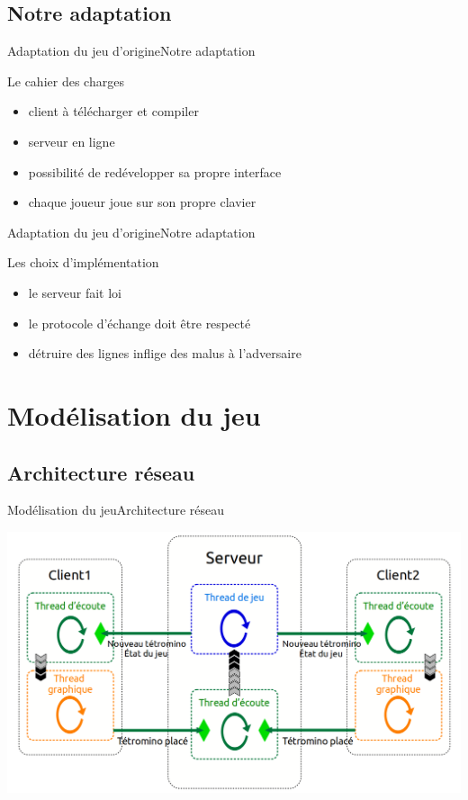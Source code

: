 \documentclass[french]{beamer}
\begin{document}
	\subsection{Notre adaptation}

\begin{frame}{Adaptation du jeu d'origine}{Notre adaptation}
	
	\begin{block}{Le cahier des charges}
		\begin{itemize}
			\item client à télécharger et compiler
			\item serveur en ligne
			\item possibilité de redévelopper sa propre interface
			\item chaque joueur joue sur son propre clavier
		\end{itemize}
	\end{block}

\end{frame}

\begin{frame}{Adaptation du jeu d'origine}{Notre adaptation}
	
	\begin{exampleblock}{Les choix d'implémentation}
		\begin{itemize}
			\item le serveur fait loi
			\item le protocole d'échange doit être respecté
			\item détruire des lignes inflige des malus à l'adversaire
		\end{itemize}
	\end{exampleblock}
\end{frame}


\section{Modélisation du jeu}
	\subsection{Architecture réseau}

		\begin{frame}{Modélisation du jeu}{Architecture réseau}
			\begin{center}
				\includegraphics[scale=0.25]{img/archi_reseau.png}
			\end{center}
		\end{frame}
\end{document}
